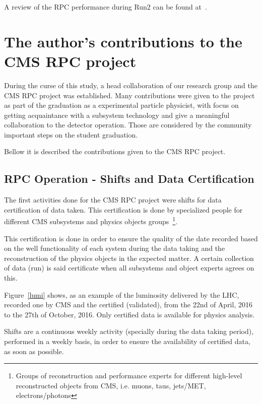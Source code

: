 A review of the RPC performance during Run2 can be found at~\cite{rpc_run2_performance}.

\section{The author's contributions to the CMS RPC project}

During the curse of this study, a head collaboration of our research group and the CMS RPC project was established. Many contributions were given to the project as part of the graduation as a experimental particle physicist, with focus on getting acquaintance with a subsystem technology and give a meaningful collaboration to the detector operation.  Those are considered by the community important steps on the student graduation.

Bellow it is described the contributions given to the CMS RPC project.

\subsection{RPC Operation - Shifts and Data Certification}

The first activities done for the CMS RPC project were shifts for data certification of data taken. This certification is done by specialized people for different CMS subsystems and physics objects groups~\footnote{Groups of reconstruction and performance experts for different high-level reconstructed objects from CMS, i.e. muons, taus, jets/MET, electrons/photons}. 
 
This certification is done in order to ensure the quality of the date recorded based on the well functionality of each system during the data taking and the reconstruction of the physics objects in the expected matter. A certain collection of data (run) is said certificate when all subsystems and object experts agrees on this.

Figure~\ref{lumi} shows, as an example of the luminosity delivered by the LHC, recorded one by CMS and the certified (validated), from the 22nd of April, 2016 to the 27th of October, 2016. Only certified data is available for physics analysis.

Shifts are a continuous weekly activity (specially during the data taking period), performed in a weekly basis, in order to ensure the availability of certified data, as soon as possible.  


